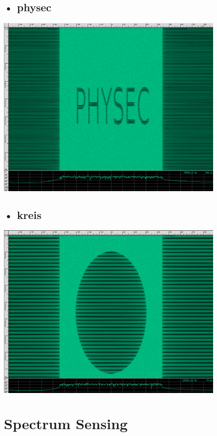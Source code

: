 \documentclass[12pt,a4paper]{article}
\begin{document}
\subsection*{• physec}
\includegraphics[width=0.85\textwidth ]{Bilder/A2_physec.png}

\subsection*{• kreis}
\includegraphics[width=0.85\textwidth ]{Bilder/A2_kreis.png}

\section{Spectrum Sensing}
\end{document}
